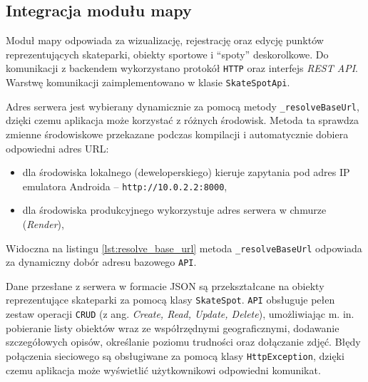     \subsection{Integracja modułu mapy}

        Moduł mapy odpowiada za wizualizację, rejestrację oraz edycję punktów reprezentujących skateparki, obiekty sportowe i \enquote{spoty} deskorolkowe. Do komunikacji z backendem wykorzystano protokół \texttt{HTTP} oraz interfejs \textit{REST API}. Warstwę komunikacji zaimplementowano w klasie \texttt{SkateSpotApi}.   

        Adres serwera jest wybierany dynamicznie za pomocą metody \texttt{\_resolveBaseUrl}, dzięki czemu aplikacja może korzystać z różnych środowisk. Metoda ta sprawdza zmienne środowiskowe przekazane podczas kompilacji i automatycznie dobiera odpowiedni adres URL:
        \begin{itemize}
            \item dla środowiska lokalnego (deweloperskiego) kieruje zapytania pod adres IP emulatora Androida – \texttt{http://10.0.2.2:8000},
            \item dla środowiska produkcyjnego wykorzystuje adres serwera w chmurze (\textit{Render}),
        \end{itemize}
            Widoczna na listingu \ref{lst:resolve_base_url} metoda \texttt{\_resolveBaseUrl} odpowiada za dynamiczny dobór adresu bazowego \texttt{API}.


        Dane przesłane z serwera w formacie JSON są przekształcane na obiekty reprezentujące skateparki za pomocą klasy \texttt{SkateSpot}. \texttt{API} obsługuje pełen zestaw operacji \texttt{CRUD} (z ang. \textit{Create, Read, Update, Delete}), umożliwiając m. in. pobieranie listy obiektów wraz ze współrzędnymi geograficznymi, dodawanie szczegółowych opisów, określanie poziomu trudności oraz dołączanie zdjęć. Błędy połączenia sieciowego są obsługiwane za pomocą klasy \texttt{HttpException}, dzięki czemu aplikacja może wyświetlić użytkownikowi odpowiedni komunikat.

